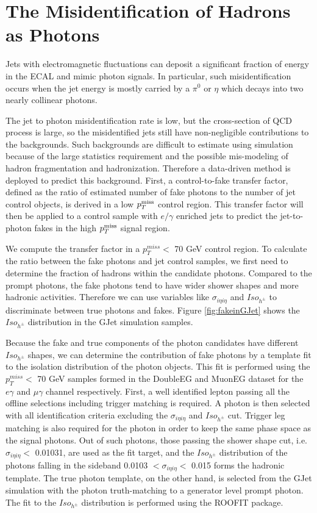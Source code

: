 \documentclass[thesis.tex]{subfiles}
\renewcommand\_{\textunderscore\allowbreak}
\begin{document}
\section{The Misidentification of Hadrons as Photons}\label{sec:jetfakepho}
Jets with electromagnetic fluctuations can deposit a significant fraction of energy in the ECAL and mimic photon signals. In particular, such misidentification occurs when the jet energy is mostly carried by a $\pi^0$ or $\eta$ which decays into two nearly collinear photons. 

The jet to photon misidentification rate is low, but the cross-section of QCD process is large, so the misidentified jets still have non-negligible contributions to the backgrounds. Such backgrounds are difficult to estimate using simulation because of the large statistics requirement and the possible mis-modeling of hadron fragmentation and hadronization. Therefore a data-driven method is deployed to predict this background. First, a control-to-fake transfer factor, defined as the ratio of estimated number of fake photons to the number of jet control objects, is derived in a low $p_T^\textrm{miss}$ control region. This transfer factor will then be applied to a control sample with $e/\gamma$ enriched jets to predict the jet-to-photon fakes in the high $p_T^\textrm{miss}$ signal region. 

We compute the transfer factor in a $p_T^{miss} < $ 70 GeV control region. To calculate the ratio between the fake photons and jet control samples, we first need to determine the fraction of hadrons within the candidate photons.  Compared to the prompt photons, the fake photons tend to have wider shower shapes and more hadronic activities. Therefore we can use variables like $\sigma_{i\eta i\eta}$ and $Iso_{h^\pm}$ to discriminate between true photons and fakes. Figure \ref{fig:fakeinGJet} shows the $Iso_{h^\pm}$ distribution in the GJet simulation samples. 

Because the fake and true components of the photon candidates have different $Iso_{h^\pm}$ shapes, we can determine the contribution of fake photons by a template fit to the isolation distribution of the photon objects. This fit is performed using the $p_T^{miss} <$ 70 GeV samples formed in the DoubleEG and MuonEG dataset for the $e\gamma$ and $\mu\gamma$ channel respectively. First, a well identified lepton passing all the offline selections including trigger matching is required. A photon is then selected with all identification criteria excluding the $\sigma_{i\eta i\eta}$ and $Iso_{h^\pm}$ cut. Trigger leg matching is also required for the photon in order to keep the same phase space as the signal photons. Out of such photons, those passing the shower shape cut, i.e. $\sigma_{i\eta i\eta} <$ 0.01031, are used as the fit target, and the $Iso_{h^\pm}$ distribution of the photons falling in the sideband 0.0103 $< \sigma_{i\eta i\eta} <$ 0.015 forms the hadronic template. The true photon template, on the other hand, is selected from the GJet simulation with the photon truth-matching to a generator level prompt photon. The fit to the $Iso_{h^\pm}$ distribution is performed using the ROOFIT package. 
\end{document}
